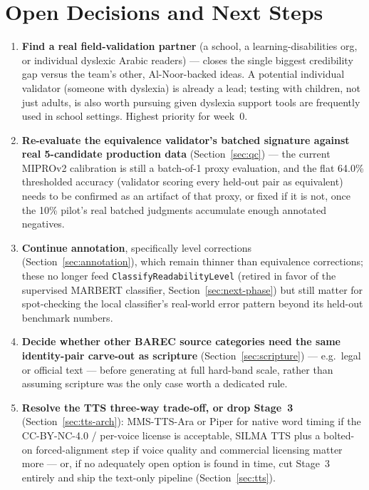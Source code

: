\documentclass[11pt,a4paper]{article}
\begin{document}
\newpage
\section{Open Decisions and Next Steps}
\label{sec:open-items}

\begin{enumerate}[leftmargin=1.6em]
  \item \textbf{Find a real field-validation partner} (a school, a
  learning-disabilities org, or individual dyslexic Arabic readers) --- closes
  the single biggest credibility gap versus the team's other, Al-Noor-backed
  ideas. A potential individual validator (someone with dyslexia) is already
  a lead; testing with children, not just adults, is also worth pursuing
  given dyslexia support tools are frequently used in school settings.
  Highest priority for week~0.
  \item \textbf{Re-evaluate the equivalence validator's batched signature
  against real 5-candidate production data} (Section~\ref{sec:qc}) --- the
  current MIPROv2 calibration is still a batch-of-1 proxy evaluation, and
  the flat 64.0\% thresholded accuracy (validator scoring every held-out
  pair as equivalent) needs to be confirmed as an artifact of that proxy,
  or fixed if it is not, once the 10\% pilot's real batched judgments
  accumulate enough annotated negatives.
  \item \textbf{Continue annotation}, specifically level corrections
  (Section~\ref{sec:annotation}), which remain thinner than equivalence
  corrections; these no longer feed \texttt{ClassifyReadabilityLevel}
  (retired in favor of the supervised MARBERT classifier,
  Section~\ref{sec:next-phase}) but still matter for spot-checking the
  local classifier's real-world error pattern beyond its held-out benchmark
  numbers.
  \item \textbf{Decide whether other BAREC source categories need the same
  identity-pair carve-out as scripture} (Section~\ref{sec:scripture}) ---
  e.g.\ legal or official text --- before generating at full hard-band scale,
  rather than assuming scripture was the only case worth a dedicated rule.
  \item \textbf{Resolve the TTS three-way trade-off, or drop Stage~3}
  (Section~\ref{sec:tts-arch}): MMS-TTS-Ara or Piper for native word timing
  if the CC-BY-NC-4.0 / per-voice license is acceptable, SILMA TTS plus a
  bolted-on forced-alignment step if voice quality and commercial licensing
  matter more --- or, if no adequately open option is found in time, cut
  Stage~3 entirely and ship the text-only pipeline (Section~\ref{sec:tts}).
\end{enumerate}
\end{document}
